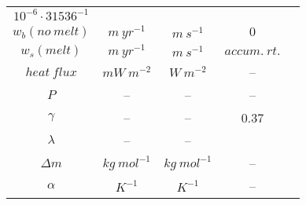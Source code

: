 \documentclass[a4paper,11pt]{article}
\begin{document}
\begin{longtable}{|c|c|c|c|c|}
\begin{math} 10^{-6} \cdot 31536^{-1} \end{math}
& \\
\cline{1-4}
\begin{math}w_b(no \: melt)\end{math} &
\begin{math} m \: yr^{-1} \end{math} &
\begin{math} m \: s^{-1}\end{math} &
\begin{math} 0 \end{math}
& \\
\cline{1-4}
\begin{math}w_s(melt)\end{math} &
\begin{math} m \: yr^{-1} \end{math} &
\begin{math} m \: s^{-1}\end{math} &
\begin{math} accum. \: rt. \end{math}
& \\
\cline{1-4}
\begin{math}heat \: flux\end{math} &
\begin{math} mW \: m^{-2} \end{math} &
\begin{math} W \: m^{-2}\end{math} &
-- & \\
\cline{1-4}
\begin{math}P\end{math} &
-- &
-- &
-- & \\
\cline{1-4}
\begin{math}\gamma\end{math} &
-- &
-- &
0.37 & \\
\cline{1-4}
\begin{math}\lambda\end{math} &
-- &
-- &
 & \\
\cline{1-4}
\begin{math}\Delta m\end{math} &
\begin{math} kg \: mol^{-1} \end{math} &
\begin{math} kg \: mol^{-1}\end{math} &
-- & \\
\cline{1-4}
\begin{math}\alpha \end{math} &
\begin{math} K^{-1} \end{math} &
\begin{math} K^{-1}\end{math} &
-- & \\
\hline
\end{longtable}


\end{document}
